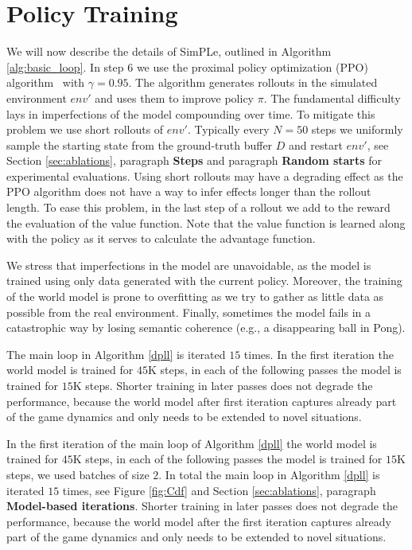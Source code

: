 \section{Policy Training} \label{sec:policy_training}

We will now describe the details of SimPLe, outlined in Algorithm \ref{alg:basic_loop}.  In step 6 we use the proximal policy optimization (PPO) algorithm~\cite{ppo} with $\gamma=0.95$. The algorithm generates rollouts in the simulated environment $env'$ and uses them to improve policy $\pi$. The fundamental difficulty lays in imperfections of the model compounding over time. To mitigate this problem we use short rollouts of $env'$. Typically every $N=50$ steps we uniformly sample the starting state from the ground-truth buffer $D$ and restart $env'$, see Section \ref{sec:ablations}, paragraph {\bf Steps} and paragraph {\bf Random starts} for experimental evaluations. Using short rollouts may have a degrading effect as the PPO algorithm does not have a way to infer effects longer than the rollout length. To ease this problem, in the last step of a rollout we add to the reward the evaluation of the value function. Note that the value function is learned along with the policy as it serves to calculate the advantage function.

We stress that imperfections in the model are unavoidable, as the model is trained using only data generated with the current policy. Moreover, the training of the world model is prone to overfitting as we try to gather as little data as possible from the real environment. Finally, sometimes the model fails in a catastrophic way by losing semantic coherence (e.g., a disappearing ball in Pong). 

The main loop in Algorithm \ref{dpll} is iterated $15$ times. In the first iteration the world model is trained for $45$K steps, in each of the following passes the model is trained for $15$K steps. 
Shorter training in later passes does not degrade the performance, because the world model after first iteration captures already part of the game dynamics and only needs to be extended to novel situations.

In the first iteration of the main loop of Algorithm \ref{dpll}  the world model is  trained for $45$K steps, in each of the following passes the model is trained for $15$K steps, we used batches of size $2$. In total the main loop in Algorithm \ref{dpll} is iterated $15$ times, see Figure \ref{fig:Cdf} and Section \ref{sec:ablations}, paragraph {\bf Model-based iterations}. 
Shorter training in later passes does not degrade the performance, because the world model after the first iteration captures already part of the game dynamics and only needs to be extended to novel situations.

